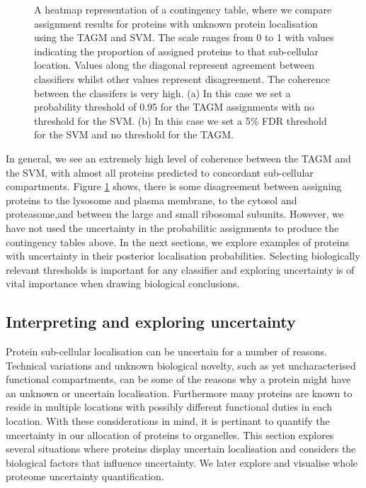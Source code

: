 \documentclass[12pt,english]{article}
\begin{document}
\begin{figure}[ht]
\begin{subfigure}[t]{0.5\textwidth}
        \caption{}
\end{subfigure}
  \caption{A heatmap representation of a contingency table,
    where we compare assignment results for proteins
    with unknown protein localisation using the TAGM and
    SVM. The scale ranges from 0 to 1 with values indicating
    the proportion of assigned proteins to that
    sub-cellular location. Values along the diagonal
    represent agreement between classifiers whilst other values
    represent disagreement. The coherence between the classifers is
    very high.
    (a)  In this case we set a probability threshold of 0.95
    for the TAGM assignments with no threshold for the SVM.
    (b)  In this case we set a 5\% FDR threshold for the SVM and
    no threshold for the TAGM.}
\label{figure:contigencytables}
\end{figure}

In general, we see an extremely high level of coherence between the
TAGM and the SVM, with almost all proteins predicted to
concordant sub-cellular compartments. Figure \ref{figure:contigencytables} shows,
there is some disagreement between assigning proteins to the lysosome and
plasma membrane, to the cytosol and proteasome,and between the large and small ribosomal subunits.
However, we have not used the uncertainty in the probabilitic assignments to produce the
contingency tables above. In the next sections, we explore examples of proteins
with uncertainty in their posterior localisation probabilities. Selecting
biologically relevant thresholds is important for any
classifier and exploring uncertainty is of vital importance
when drawing biological conclusions.

\clearpage
\subsection{Interpreting and exploring uncertainty}

Protein sub-cellular localisation can be uncertain for a number of
reasons. Technical variations and unknown biological novelty, such
as yet uncharacterised functional compartments,
can be some of the reasons why a protein might have an unknown
or uncertain localisation. Furthermore many proteins are known to
reside in multiple locations with possibly different functional duties
in each location. With these considerations in mind, it is pertinant
to quantify the uncertainty in our allocation of proteins to organelles.
This section explores several situations where proteins display uncertain
localisation and considers the biological factors that influence uncertainty.
We later explore and visualise whole proteome uncertainty quantification.
\end{document}

